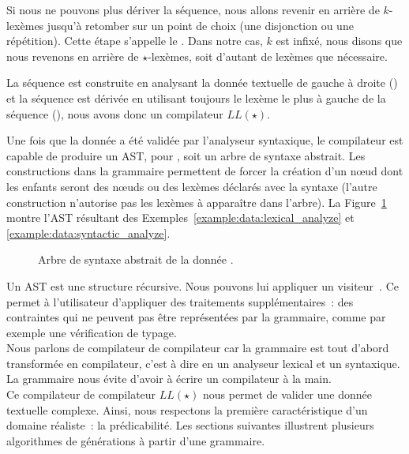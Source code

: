Si nous ne pouvons plus dériver la séquence, nous allons revenir en arrière de
$k$-lexèmes jusqu'à retomber sur un point de choix (une disjonction ou une
répétition). Cette étape s'appelle le . Dans notre cas,
$k$ est infixé, nous disons que nous revenons en arrière de $\star$-lexèmes,
soit d'autant de lexèmes que nécessaire.

La séquence est construite en analysant la donnée textuelle de gauche à droite
() et la séquence est dérivée en utilisant
toujours le lexème le plus à gauche de la séquence (), nous avons donc un compilateur $LL(\star)$.

Une fois que la donnée a été validée par l'analyseur syntaxique, le compilateur
est capable de produire un AST, pour , soit un
arbre de syntaxe abstrait. Les constructions  dans la grammaire
permettent de forcer la création d'un nœud dont les enfants seront des nœuds ou
des lexèmes déclarés avec la syntaxe  (l'autre construction
 n'autorise pas les lexèmes à apparaître dans l'arbre). La
Figure~\ref{figure:data:ast} montre l'AST résultant des
Exemples~\ref{example:data:lexical_analyze} et
\ref{example:data:syntactic_analyze}.
%
\begin{figure}


\caption{\label{figure:data:ast} Arbre de syntaxe abstrait de la donnée .}

\end{figure}
%
Un AST est une structure récursive. Nous pouvons lui appliquer un {\strong
visiteur}~. Ce  permet à
l'utilisateur d'appliquer des traitements supplémentaires~: des contraintes qui
ne peuvent pas être représentées par la grammaire, comme par exemple une
vérification de typage. \\

Nous parlons de {\strong compilateur de compilateur} car la grammaire est tout
d'abord transformée en compilateur, c'est à dire en un analyseur lexical et un
syntaxique. La grammaire nous évite d'avoir à écrire un compilateur à la main. \\

Ce compilateur de compilateur $LL(\star)$ nous permet de valider une donnée
textuelle complexe. Ainsi, nous respectons la première caractéristique d'un
domaine réaliste~: la prédicabilité. Les sections suivantes illustrent plusieurs
algorithmes de générations à partir d'une grammaire.

